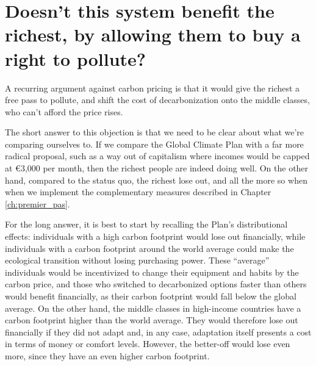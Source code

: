 \documentclass[a5paper,english,openany]{memoir}
\begin{document}
\section*{\normalsize Doesn't this system benefit the richest, by allowing them to buy a right to pollute?}\label{q:riches}

A recurring argument against carbon pricing is that it would give the richest a free pass to pollute, and shift the cost of decarbonization onto the middle classes, who can't %
afford the price rises. 

The short answer to this objection is that we need to be clear about what we're %
comparing ourselves to. If we compare the Global Climate Plan with a far more radical proposal, such as a way out of capitalism where incomes would be capped at \euro{}3,000 per month, then the richest people are indeed doing well. On the other hand, compared to the status quo, the richest lose out, and all the more so when when we implement the complementary measures described in Chapter \ref{ch:premier_pas}. %

For the long answer, it is best to %
start by recalling the Plan's distributional effects: individuals with a high carbon footprint would lose out financially, while individuals with a carbon footprint around the world average could make the ecological transition %
without losing purchasing power. These ``average'' individuals would be incentivized %
to change their equipment and habits by the carbon price, and those who switched to decarbonized %
options faster than others would benefit financially, as their carbon footprint would fall below the global average. %
On the other hand, the middle classes in high-income countries have a carbon footprint higher %
than the world average. %
They would therefore lose out financially if they did not adapt and, in any case, adaptation itself presents a cost in terms of money or comfort levels. %
However, the better-off would lose even more, since they have an even higher carbon footprint. 
\end{document}
